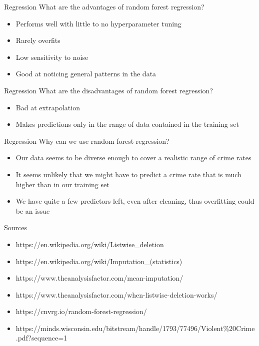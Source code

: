 \documentclass{beamer}
\begin{document}
	\begin{frame}{Regression}
		What are the advantages of random forest regression?
		\begin{itemize}
			\item Performs well with little to no hyperparameter tuning
			\item Rarely overfits
			\item Low sensitivity to noise
			\item Good at noticing general patterns in the data
		\end{itemize}
	\end{frame}
	\begin{frame}{Regression}
		What are the disadvantages of random forest regression?
		\begin{itemize}
			\item Bad at extrapolation
			\item Makes predictions only in the range of data contained in the training set
		\end{itemize}
	\end{frame}
	\begin{frame}{Regression}
		Why can we use random forest regression?
		\begin{itemize}
			\item Our data seems to be diverse enough to cover a realistic range of crime rates
			\item It seems unlikely that we might have to predict a crime rate that is much higher than in our training set
			\item We have quite a few predictors left, even after cleaning, thus overfitting could be an issue
		\end{itemize}
	\end{frame}
	
	\begin{frame}{Sources}
		\begin{itemize}
			\item https://en.wikipedia.org/wiki/Listwise\_deletion
			\item https://en.wikipedia.org/wiki/Imputation\_(statistics)
			\item https://www.theanalysisfactor.com/mean-imputation/
			\item https://www.theanalysisfactor.com/when-listwise-deletion-works/
			\item https://cnvrg.io/random-forest-regression/
			\item https://minds.wisconsin.edu/bitstream/handle/1793/77496/Violent\%20Crime.pdf?sequence=1
		\end{itemize}
	\end{frame}
\end{document}
